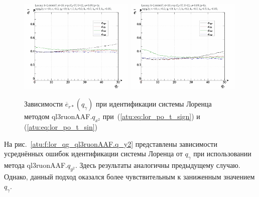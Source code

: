 \begin{figure}[ht!]
  \centerline{
    \includegraphics[width=0.49\textwidth]{p/cha/lor/ql3ruonAAF/lor_ql3ruonAAF_qx2-p_qgamma_e_sign.png}
    \hfill
    \includegraphics[width=0.49\textwidth]{p/cha/lor/ql3ruonAAF/lor_ql3ruonAAF_qx2-p_qgamma_e_sin.png}
  }
  \caption{Зависимости $\overline{e}_{r*}(q_\gamma)$ при идентификации системы Лоренца методом ql3ruonAAF.$q_{x^2}$
   при~(\ref{atu:eq:lor_po_t_sign}) и (\ref{atu:eq:lor_po_t_sin})}
  \label{atu:f:lor_qg_ql3ruonAAF.q_x2}
\end{figure}



На рис.~\ref{atu:f:lor_qg_ql3ruonAAF.q_y2} представлены зависимости
усреднённых ошибок идентификации системы Лоренца от $q_\gamma$ при использовании метода ql3ruonAAF.$q_{y^2}$.
Здесь результаты аналогичны предыдущему случаю. Однако,
данный подход оказался более чувствительным к заниженным значением $q_\gamma$.

